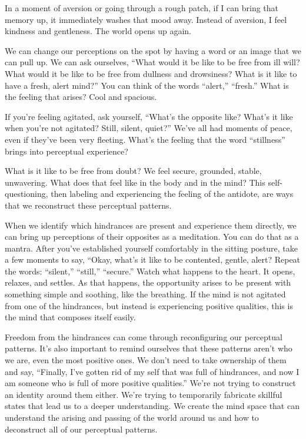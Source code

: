 In a moment of aversion or going through a rough patch, if I can bring that memory up, it immediately washes that mood away. Instead of aversion, I feel kindness and gentleness. The world opens up again.

We can change our perceptions on the spot by having a word or an image that we can pull up. We can ask ourselves, ``What would it be like to be free from ill will? What would it be like to be free from dullness and drowsiness? What is it like to have a fresh, alert mind?'' You can think of the words ``alert,'' ``fresh.'' What is the feeling that arises? Cool and spacious.

If you're feeling agitated, ask yourself, ``What's the opposite like? What's it like when you're not agitated? Still, silent, quiet?'' We've all had moments of peace, even if they've been very fleeting. What's the feeling that the word ``stillness'' brings into perceptual experience?

What is it like to be free from doubt? We feel secure, grounded, stable, unwavering. What does that feel like in the body and in the mind? This self-questioning, then labeling and experiencing the feeling of the antidote, are ways that we reconstruct these perceptual patterns.

When we identify which hindrances are present and experience them directly, we can bring up perceptions of their opposites as a meditation. You can do that as a mantra. After you've established yourself comfortably in the sitting posture, take a few moments to say, ``Okay, what's it like to be contented, gentle, alert? Repeat the words: ``silent,'' ``still,'' ``secure.'' Watch what happens to the heart. It opens, relaxes, and settles. As that happens, the opportunity arises to be present with something simple and soothing, like the breathing. If the mind is not agitated from one of the hindrances, but instead is experiencing positive qualities, this is the mind that composes itself easily.

Freedom from the hindrances can come through reconfiguring our perceptual patterns. It's also important to remind ourselves that these patterns aren't who we are, even the most positive ones. We don't need to take ownership of them and say, ``Finally, I've gotten rid of my self that was full of hindrances, and now I am someone who is full of more positive qualities.'' We're not trying to construct an identity around them either. We're trying to temporarily fabricate skillful states that lead us to a deeper understanding. We create the mind space that can understand the arising and passing of the world around us and how to deconstruct all of our perceptual patterns.

